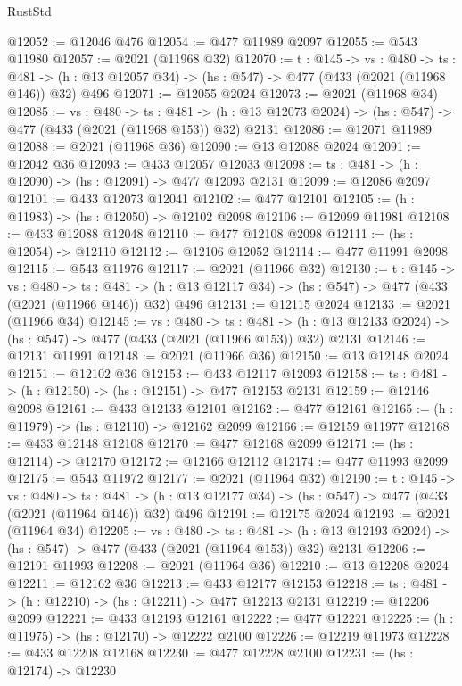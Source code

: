 \begin{lexlean}{RustStd}
\begin{coremodule}
@12052 := @12046 @476
@12054 := @477 @11989 @2097
@12055 := @543 @11980
@12057 := @2021 (@11968 @32)
@12070 := {t : @145} ->
  {vs : @480} ->
  {ts : @481} -> (h : @13 @12057 @34) -> (hs : @547) -> @477 (@433 (@2021 (@11968 @146)) @32) @496
@12071 := @12055 @2024
@12073 := @2021 (@11968 @34)
@12085 := {vs : @480} ->
  {ts : @481} ->
  (h : @13 @12073 @2024) -> (hs : @547) -> @477 (@433 (@2021 (@11968 @153)) @32) @2131
@12086 := @12071 @11989
@12088 := @2021 (@11968 @36)
@12090 := @13 @12088 @2024
@12091 := @12042 @36
@12093 := @433 @12057 @12033
@12098 := {ts : @481} -> (h : @12090) -> (hs : @12091) -> @477 @12093 @2131
@12099 := @12086 @2097
@12101 := @433 @12073 @12041
@12102 := @477 @12101
@12105 := (h : @11983) -> (hs : @12050) -> @12102 @2098
@12106 := @12099 @11981
@12108 := @433 @12088 @12048
@12110 := @477 @12108 @2098
@12111 := (hs : @12054) -> @12110
@12112 := @12106 @12052
@12114 := @477 @11991 @2098
@12115 := @543 @11976
@12117 := @2021 (@11966 @32)
@12130 := {t : @145} ->
  {vs : @480} ->
  {ts : @481} -> (h : @13 @12117 @34) -> (hs : @547) -> @477 (@433 (@2021 (@11966 @146)) @32) @496
@12131 := @12115 @2024
@12133 := @2021 (@11966 @34)
@12145 := {vs : @480} ->
  {ts : @481} ->
  (h : @13 @12133 @2024) -> (hs : @547) -> @477 (@433 (@2021 (@11966 @153)) @32) @2131
@12146 := @12131 @11991
@12148 := @2021 (@11966 @36)
@12150 := @13 @12148 @2024
@12151 := @12102 @36
@12153 := @433 @12117 @12093
@12158 := {ts : @481} -> (h : @12150) -> (hs : @12151) -> @477 @12153 @2131
@12159 := @12146 @2098
@12161 := @433 @12133 @12101
@12162 := @477 @12161
@12165 := (h : @11979) -> (hs : @12110) -> @12162 @2099
@12166 := @12159 @11977
@12168 := @433 @12148 @12108
@12170 := @477 @12168 @2099
@12171 := (hs : @12114) -> @12170
@12172 := @12166 @12112
@12174 := @477 @11993 @2099
@12175 := @543 @11972
@12177 := @2021 (@11964 @32)
@12190 := {t : @145} ->
  {vs : @480} ->
  {ts : @481} -> (h : @13 @12177 @34) -> (hs : @547) -> @477 (@433 (@2021 (@11964 @146)) @32) @496
@12191 := @12175 @2024
@12193 := @2021 (@11964 @34)
@12205 := {vs : @480} ->
  {ts : @481} ->
  (h : @13 @12193 @2024) -> (hs : @547) -> @477 (@433 (@2021 (@11964 @153)) @32) @2131
@12206 := @12191 @11993
@12208 := @2021 (@11964 @36)
@12210 := @13 @12208 @2024
@12211 := @12162 @36
@12213 := @433 @12177 @12153
@12218 := {ts : @481} -> (h : @12210) -> (hs : @12211) -> @477 @12213 @2131
@12219 := @12206 @2099
@12221 := @433 @12193 @12161
@12222 := @477 @12221
@12225 := (h : @11975) -> (hs : @12170) -> @12222 @2100
@12226 := @12219 @11973
@12228 := @433 @12208 @12168
@12230 := @477 @12228 @2100
@12231 := (hs : @12174) -> @12230

\end{coremodule}
\end{lexlean}
